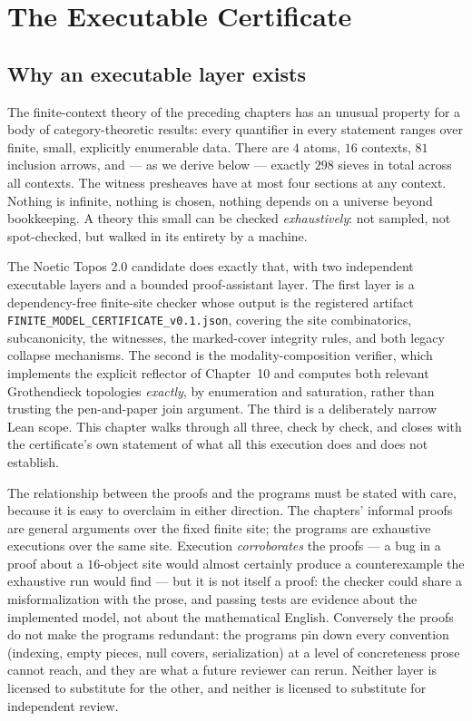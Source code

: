 \chapter{The Executable Certificate}
\label{ch11:chapter}

\section{Why an executable layer exists}
\label{ch11:sec:why}

The finite-context theory of the preceding chapters has an unusual property
for a body of category-theoretic results: every quantifier in every statement
ranges over finite, small, explicitly enumerable data. There are $4$ atoms,
$16$ contexts, $81$ inclusion arrows, and --- as we derive below --- exactly
$298$ sieves in total across all contexts. The witness presheaves have at most
four sections at any context. Nothing is infinite, nothing is chosen, nothing
depends on a universe beyond bookkeeping. A theory this small can be checked
\emph{exhaustively}: not sampled, not spot-checked, but walked in its
entirety by a machine.

The Noetic Topos 2.0 candidate does exactly that, with two independent
executable layers and a bounded proof-assistant layer. The first layer is a
dependency-free finite-site checker whose output is the registered artifact
\texttt{FINITE\_MODEL\_CERTIFICATE\_v0.1.json}, covering the site
combinatorics, subcanonicity, the witnesses, the marked-cover integrity
rules, and both legacy collapse mechanisms. The second is the
modality-composition verifier, which implements the explicit reflector of
Chapter~10 and computes both relevant Grothendieck topologies \emph{exactly},
by enumeration and saturation, rather than trusting the pen-and-paper join
argument. The third is a deliberately narrow Lean scope. This chapter walks
through all three, check by check, and closes with the certificate's own
statement of what all this execution does and does not establish.

\begin{boundary}
\label{ch11:bnd:role}
The relationship between the proofs and the programs must be stated with
care, because it is easy to overclaim in either direction. The chapters'
informal proofs are general arguments over the fixed finite site; the
programs are exhaustive executions over the same site. Execution
\emph{corroborates} the proofs --- a bug in a proof about a $16$-object site
would almost certainly produce a counterexample the exhaustive run would
find --- but it is not itself a proof: the checker could share a
misformalization with the prose, and passing tests are evidence about the
implemented model, not about the mathematical English. Conversely the proofs
do not make the programs redundant: the programs pin down every convention
(indexing, empty pieces, null covers, serialization) at a level of
concreteness prose cannot reach, and they are what a future reviewer can
rerun. Neither layer is licensed to substitute for the other, and neither is
licensed to substitute for independent review.
\end{boundary}

